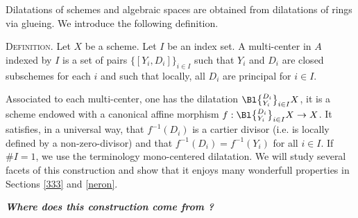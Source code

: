 \documentclass[10pt]{alggeom}
\theoremstyle{definition}
\numberwithin{equation}{section}
\begin{document}
Dilatations of schemes and algebraic spaces are obtained from dilatations of rings via glueing. We introduce the following definition.

\begin{flushleft}

\textsc{Definition.} Let $X$ be a scheme. Let $I$ be an index set. A multi-center in $A$ indexed by $I$ is a set of pairs $\{[Y_i, D_i]\}_{i \in I } $ such that $Y_i$ and $D_i $ are closed subschemes for each $i$ and such that locally, all $D_i$ are principal for $i \in I$.
\end{flushleft}

Associated to each multi-center, one has the dilatation $\Bl \big\{{}^{D_i}_{Y_i} \big\}_{i \in I } X $, it is a scheme endowed with a canonical affine morphism $f: \Bl \big\{{}^{D_i}_{Y_i} \big\}_{i \in I } X \to X$. It satisfies, in a universal way, that $f^{-1} (D_i)$ is a cartier divisor (i.e. is locally defined by a non-zero-divisor) and that $f^{-1} (D_i ) = f^{-1} (Y_i)$ for all $i \in I$. If $\#I=1$, we use the terminology mono-centered dilatation.
 We will study several facets of this construction and show that it enjoys many wonderfull properties in Sections \ref{333} and \ref{neron}. 


\begin{center}
\textbf{\textit{{Where does this construction come from ? }}}
\end{center}
\end{document}
